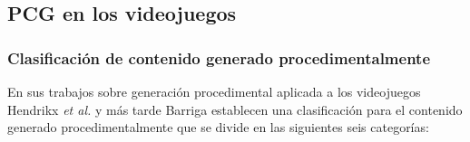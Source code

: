 
\subsection{PCG en los videojuegos}

\subsubsection{Clasificación de contenido generado procedimentalmente}

En sus trabajos sobre generación procedimental aplicada a los videojuegos Hendrikx \textit{et al.} \cite{hendrikx2013} y más tarde Barriga \cite{barriga2019} establecen una clasificación para el contenido generado procedimentalmente que se divide en las siguientes seis categorías:

